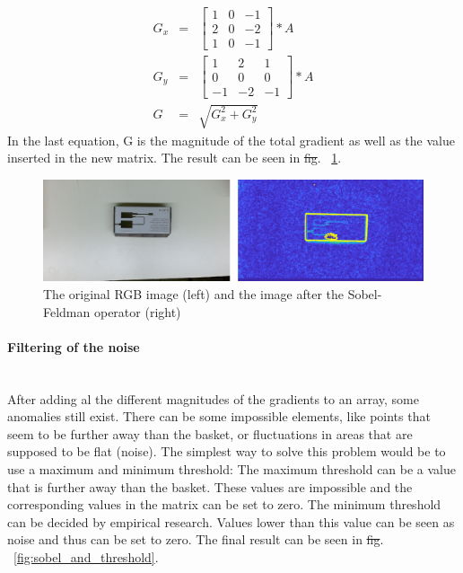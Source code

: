 \documentclass{article}
\providecommand{\DIFaddtex}[1]{{\protect\color{blue}\uwave{#1}}} %
\providecommand{\DIFdeltex}[1]{{\protect\color{red}\sout{#1}}}                      %
\providecommand{\DIFaddbegin}{} %
\providecommand{\DIFaddend}{} %
\providecommand{\DIFdelbegin}{} %
\providecommand{\DIFdelend}{} %
\providecommand{\DIFadd}[1]{\texorpdfstring{\DIFaddtex{#1}}{#1}} %
\providecommand{\DIFdel}[1]{\texorpdfstring{\DIFdeltex{#1}}{}} %
\newcommand{\DIFscaledelfig}{0.5}
\newlength{\DIFdelgraphicswidth} %
\newlength{\DIFdelgraphicsheight} %
\newcommand{\DIFaddincludegraphics}[2][]{{\color{blue}\fbox{\DIFOincludegraphics[#1]{#2}}}} %
\newcommand{\DIFdelincludegraphics}[2][]{%
\sbox{\DIFdelgraphicsbox}{\DIFOincludegraphics[#1]{#2}}%
\settoboxwidth{\DIFdelgraphicswidth}{\DIFdelgraphicsbox} %
\settoboxtotalheight{\DIFdelgraphicsheight}{\DIFdelgraphicsbox} %
\scalebox{\DIFscaledelfig}{%
\parbox[b]{\DIFdelgraphicswidth}{\usebox{\DIFdelgraphicsbox}\\[-\baselineskip] \rule{\DIFdelgraphicswidth}{0em}}\llap{\resizebox{\DIFdelgraphicswidth}{\DIFdelgraphicsheight}{%
\setlength{\unitlength}{\DIFdelgraphicswidth}%
\begin{picture}(1,1)%
\thicklines\linethickness{2pt} %
{\color[rgb]{1,0,0}\put(0,0){\framebox(1,1){}}}%
{\color[rgb]{1,0,0}\put(0,0){\line( 1,1){1}}}%
{\color[rgb]{1,0,0}\put(0,1){\line(1,-1){1}}}%
\end{picture}%
}\hspace*{3pt}}} %
} %
\DeclareRobustCommand{\DIFaddbegin}{\DIFOaddbegin \let\includegraphics\DIFaddincludegraphics} %
\DeclareRobustCommand{\DIFaddend}{\DIFOaddend \let\includegraphics\DIFOincludegraphics} %
\DeclareRobustCommand{\DIFdelbegin}{\DIFOdelbegin \let\includegraphics\DIFdelincludegraphics} %
\DeclareRobustCommand{\DIFdelend}{\DIFOaddend \let\includegraphics\DIFOincludegraphics} %
\begin{document}
\begin{eqnarray*}
G_{x} &=& 
	\begin{bmatrix}
		1&0&-1\\
		2&0&-2\\
		1&0&-1
	\end{bmatrix}
	*A \\
G_{y} &=& 
	\begin{bmatrix}
		1&2&1\\
		0&0&0\\
		-1&-2&-1
	\end{bmatrix}
	*A\\
G &=& \sqrt{G_{x}^2+G_{y}^2}
\end{eqnarray*}
In the last equation, G is the magnitude of the total gradient as well as the value inserted in the new matrix.
The result can be seen in \DIFdelbegin \DIFdel{fig}\DIFdelend \DIFaddbegin \DIFadd{Fig}\DIFaddend . ~\ref{fig:original_and_sobel}.
\begin{figure}[h]
	\center
  \includegraphics[width=1\linewidth]{original_and_sobel.png}
  \caption{The original RGB image (left) and the image after the Sobel-Feldman operator (right)}
  \label{fig:original_and_sobel}
\end{figure}

\paragraph{Filtering of the noise}\mbox{}\\
After adding al the different magnitudes of the gradients to an array, some anomalies still exist. There can be some impossible elements, like points that seem to be further away than the basket, or fluctuations in areas that are supposed to be flat (noise). The simplest way to solve this problem would be to use a maximum and minimum threshold: The maximum threshold can be a value that is further away than the basket. These values are impossible and the corresponding values in the matrix can be set to zero. The minimum threshold can be decided by empirical research. Values lower than this value can be seen as noise and thus can be set to zero. The final result can be seen in \DIFdelbegin \DIFdel{fig}\DIFdelend \DIFaddbegin \DIFadd{Fig}\DIFaddend . ~\ref{fig:sobel_and_threshold}.
\end{document}
